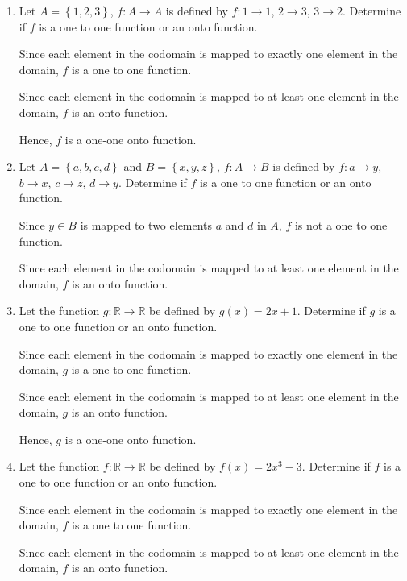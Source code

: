 \documentclass[12pt]{report}
\begin{document}
\begin{enumerate}
  \item Let $A = \left\{1, 2, 3\right\}$, $f: A \to A$ is defined by $f: 1 \to 1$, $2
          \to 3$, $3 \to 2$. Determine if $f$ is a one to one function or an onto
        function. \sol{}

        Since each element in the codomain is mapped to exactly one element in the
        domain, $f$ is a one to one function.

        Since each element in the codomain is mapped to at least one element in the
        domain, $f$ is an onto function.

        Hence, $f$ is a one-one onto function.

  \item Let $A = \left\{a, b, c, d\right\}$ and $B = \left\{x, y, z\right\}$, $f: A \to
          B$ is defined by $f: a \to y$, $b \to x$, $c \to z$, $d \to y$. Determine if
        $f$ is a one to one function or an onto function. \sol{}

        Since $y \in B$ is mapped to two elements $a$ and $d$ in $A$, $f$ is not a one
        to one function.

        Since each element in the codomain is mapped to at least one element in the
        domain, $f$ is an onto function.

  \item Let the function $g: \mathbb{R} \to \mathbb{R}$ be defined by $g(x) = 2x + 1$.
        Determine if $g$ is a one to one function or an onto function. \sol{}

        Since each element in the codomain is mapped to exactly one element in the
        domain, $g$ is a one to one function.

        Since each element in the codomain is mapped to at least one element in the
        domain, $g$ is an onto function.

        Hence, $g$ is a one-one onto function.

  \item Let the function $f: \mathbb{R} \to \mathbb{R}$ be defined by $f (x) = 2x^3 -
          3$. Determine if $f$ is a one to one function or an onto function. \sol{}

        Since each element in the codomain is mapped to exactly one element in the
        domain, $f$ is a one to one function.

        Since each element in the codomain is mapped to at least one element in the
        domain, $f$ is an onto function.


\end{enumerate}
\end{document}
